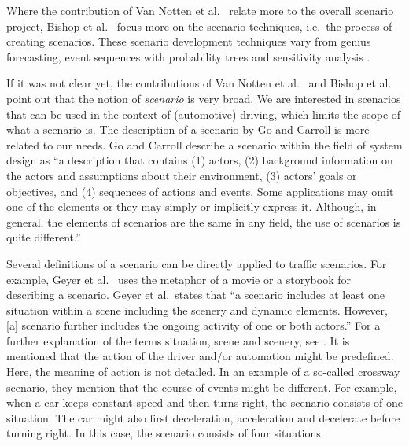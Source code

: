 \documentclass[10pt,final,a4paper,oneside,onecolumn]{article}
\begin{document}
Where the contribution of Van Notten et al.\ \cite{vannotten2003updated} relate more to the overall scenario project, Bishop et al.\ \cite{bishop2007scentechniques} focus more on the scenario techniques, i.e.\ the process of creating scenarios. These scenario development techniques vary from genius forecasting, event sequences with probability trees and sensitivity analysis \cite{bishop2007scentechniques}.

If it was not clear yet, the contributions of Van Notten et al.\ \cite{vannotten2003updated} and Bishop et al.\ \cite{bishop2007scentechniques} point out that the notion of \emph{scenario} is very broad. We are interested in scenarios that can be used in the context of (automotive) driving, which limits the scope of what a scenario is. The description of a scenario by Go and Carroll \cite{go2004blind} is more related to our needs.
Go and Carroll \cite{go2004blind} describe a scenario within the field of system design as ``a description that contains (1) actors, (2) background information on the actors and assumptions about their environment, (3) actors' goals or objectives, and (4) sequences of actions and events. Some applications may omit one of the elements or they may simply or implicitly express it. Although, in general, the elements of scenarios are the same in any field, the use of scenarios is quite different.'' 

Several definitions of a scenario can be directly applied to traffic scenarios. For example, Geyer et al.\ \cite{geyer2014} uses the metaphor of a movie or a storybook for describing a scenario. Geyer et al.\ states that ``a scenario includes at least one situation within a scene including the scenery and dynamic elements. However, [a] scenario further includes the ongoing activity of one or both actors.'' For a further explanation of the terms situation, scene and scenery, see \cite{geyer2014}. It is mentioned that the action of the driver and/or automation might be predefined. Here, the meaning of action is not detailed. In an example of a so-called crossway scenario, they mention that the course of events might be different. For example, when a car keeps constant speed and then turns right, the scenario consists of one situation. The car might also first deceleration, acceleration and decelerate before turning right. In this case, the scenario consists of four situations.
\end{document}
